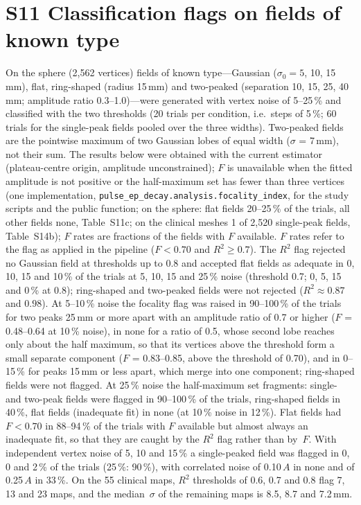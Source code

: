\documentclass[10pt,a4paper]{article}
\begin{document}
\section*{S11 Classification flags on fields of known type}
On the sphere (2{,}562 vertices) fields of known type---Gaussian ($\sigma_0 = 5$, 10, 15\,mm), flat, ring-shaped (radius 15\,mm) and two-peaked (separation 10, 15, 25, 40\,mm; amplitude ratio 0.3--1.0)---were generated with vertex noise of 5--25\,\% and classified with the two thresholds (20 trials per condition, i.e.\ steps of 5\,\%; 60 trials for the single-peak fields pooled over the three widths).  Two-peaked fields are the pointwise maximum of two Gaussian lobes of equal width ($\sigma$ = 7\,mm), not their sum.  The results below were obtained with the current estimator (plateau-centre origin, amplitude unconstrained); $F$ is unavailable when the fitted amplitude is not positive or the half-maximum set has fewer than three vertices (one implementation, \texttt{pulse\_ep\_decay.analysis.focality\_index}, for the study scripts and the public function; on the sphere: flat fields 20--25\,\% of the trials, all other fields none, Table~S11c; on the clinical meshes 1 of 2{,}520 single-peak fields, Table~S14b); $F$ rates are fractions of the fields with $F$ available.  $F$ rates refer to the flag as applied in the pipeline ($F < 0.70$ and $R^2 \ge 0.7$).  The $R^2$ flag rejected no Gaussian field at thresholds up to 0.8 and accepted flat fields as adequate in 0, 10, 15 and 10\,\% of the trials at 5, 10, 15 and 25\,\% noise (threshold 0.7; 0, 5, 15 and 0\,\% at 0.8); ring-shaped and two-peaked fields were not rejected ($R^2 \approx 0.87$ and $0.98$).  At 5--10\,\% noise the focality flag was raised in 90--100\,\% of the trials for two peaks 25\,mm or more apart with an amplitude ratio of 0.7 or higher ($F$ = 0.48--0.64 at 10\,\% noise), in none for a ratio of 0.5, whose second lobe reaches only about the half maximum, so that its vertices above the threshold form a small separate component ($F$ = 0.83--0.85, above the threshold of 0.70), and in 0--15\,\% for peaks 15\,mm or less apart, which merge into one component; ring-shaped fields were not flagged.  At 25\,\% noise the half-maximum set fragments: single- and two-peak fields were flagged in 90--100\,\% of the trials, ring-shaped fields in 40\,\%, flat fields (inadequate fit) in none (at 10\,\% noise in 12\,\%).  Flat fields had $F < 0.70$ in 88--94\,\% of the trials with $F$ available but almost always an inadequate fit, so that they are caught by the $R^2$ flag rather than by~$F$.  With independent vertex noise of 5, 10 and 15\,\% a single-peaked field was flagged in 0, 0 and 2\,\% of the trials (25\,\%: 90\,\%), with correlated noise of 0.10\,$A$ in none and of 0.25\,$A$ in 33\,\%.  On the 55 clinical maps, $R^2$ thresholds of 0.6, 0.7 and 0.8 flag 7, 13 and 23 maps, and the median~$\sigma$ of the remaining maps is 8.5, 8.7 and 7.2\,mm.
\end{document}

